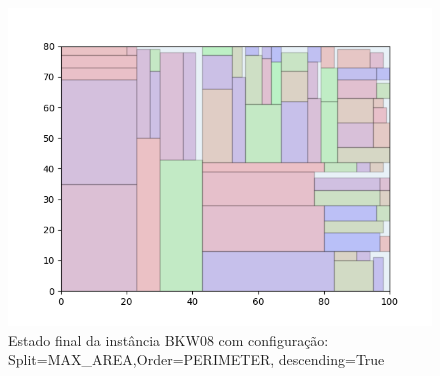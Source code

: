 \begin{figure}[H]
    \centering
    \caption[]{Estado final da instância BKW08 com configuração: Split=MAX_AREA,Order=PERIMETER, descending=True}
    \label{fig:bkw08-max_area-perimeter-true}
    \includegraphics[scale=0.5]{output/figures/bkw/bkw08/max_area/perimeter/true/00}
\end{figure}
